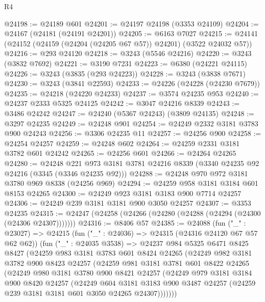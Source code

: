 \begin{lexlean}{R4}
\begin{coremodule}
@24198 := @24189 @601
@24201 := @24197 @24198 (@3353 @24109)
@24204 := @24167 (@24181 (@24191 @24201))
@24205 := @6163 @7027
@24215 := @24141 (@24152 (@24159 (@24204 (@24205 @67 @57)) @24201) (@3522 @24032 @57))
@24216 := @293 @24120
@24218 := @3243 (@5546 @24216)
@24220 := @3243 (@3832 @7692)
@24221 := @3190 @7231
@24223 := @6380 (@24221 @24115)
@24226 := @3243 (@3835 (@293 @24223))
@24228 := @3243 (@3838 @7671)
@24230 := @3243 (@3841 @22593)
@24233 := @24226 (@24228 (@24230 @7679))
@24235 := @24218 (@24220 @24233)
@24237 := @3574 @24235 @953
@24240 := @24237 @2333 @5325 @24125
@24242 := @3047 @24216 @8339
@24243 := @3486 @24242
@24247 := @24240 (@5367 @24243) (@3809 @24135)
@24248 := @3297 @24235
@24249 := @24248 @901
@24254 := @24249 @2332 @3181 @3783 @900 @24243
@24256 := @3306 @24235 @11
@24257 := @24256 @900
@24258 := @24254 @24257
@24259 := @24248 @602
@24264 := @24259 @2331 @3181 @3782 @601 @24242
@24265 := @24256 @601
@24266 := @24264 @24265
@24280 := @24248
    @221
    @973
    @3181
    @3781
    @24216
    @8339
    (@3340 @24235 @92 @24216 (@3345 (@3346 @24235 @92)))
@24288 := @24248 @970 @972 @3181 @3780 @969 @8338 (@24256 @969)
@24294 := @24259 @958 @3181 @3184 @601 @8153 @24265
@24300 := @24249 @923 @3181 @3183 @900 @7714 @24257
@24306 := @24249 @239 @3181 @3181 @900 @3050 @24257
@24307 := @3353 @24235
@24315 := @24247 (@24258 (@24266 (@24280 (@24288 (@24294 (@24300 (@24306 @24307)))))))
@24316 := @8406 @57
@24385 := @24088
    (fun ("_" : @23027) =>
    @24215
      (fun ("_" : @24036) => @24315 (@24316 @24120 @67 @57 @62 @62))
      (fun ("_" : @24035 @3538) =>
      @24237
        @984
        @5325
        @6471
        @8425
        @8427
        (@24259
          @983
          @3181
          @3783
          @601
          @8424
          @24265
          (@24249
            @982
            @3181
            @3782
            @900
            @8423
            @24257
            (@24259
              @981
              @3181
              @3781
              @601
              @8422
              @24265
              (@24249
                @980
                @3181
                @3780
                @900
                @8421
                @24257
                (@24249
                  @979
                  @3181
                  @3184
                  @900
                  @8420
                  @24257
                  (@24249
                    @604
                    @3181
                    @3183
                    @900
                    @3487
                    @24257
                    (@24259 @239 @3181 @3181 @601 @3050 @24265 @24307)))))))

\end{coremodule}
\end{lexlean}

